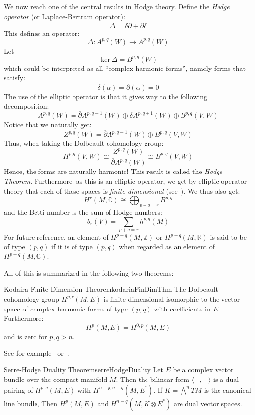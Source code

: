 \documentclass{book}
\newcommand{\C}{{\mathbb{C}}}
\newcommand{\R}{{\mathbb{R}}}
\newcommand{\Z}{{\mathbb{Z}}}
\begin{document}
We now reach one of the central results in Hodge theory. Define the \emph{Hodge operator} (or Laplace-Bertram
operator):
\[
  \Delta = \delta\overline{\partial} + \overline{\partial}\delta
\]
This defines an operator:
\[
  \Delta: A^{p,q}(W) \to A^{p,q}(W)
\]
Let
\[
  \ker\Delta = B^{p,q}(W)
\]
which could be interpreted as all ``complex harmonic forms'', namely forms that satisfy:
\[
  \delta(\alpha) = \overline{\partial}(\alpha) = 0
\]
The use of the elliptic operator is that it gives way to the following decomposition:
\[
  A^{p,q}(W) = \overline{\partial}A^{p, q-1}(W) \oplus \delta A^{p, q+1}(W) \oplus B^{p,q}(V,W)
\]
Notice that we naturally get:
\[
  Z^{p,q}(W) = \overline{\partial}A^{p, q-1}(W) \oplus B^{p,q}(V,W)
\]
Thus, when taking the Dolbeault cohomology group:
\[
  H^{p,q}(V,W) \cong \frac{Z^{p,q}(W)}{\overline{\partial}A^{p,q}(W)} \cong B^{p,q}(V,W)
\]
Hence, the forms are naturally harmonic! This result is called the \emph{Hodge Theorem}. Furthermore, as this
is an elliptic operator, we get by elliptic operator theory that each of these spaces is \emph{finite
dimensional} (see~\cite{HodgeTheory2014}). We thus also get:
\[
  H^r(M, \C) \cong \bigoplus_{p+q=r} B^{p,q}
\]
and the Betti number is the sum of Hodge numbers:
\[
  b_r(V) = \sum_{p+q=r} h^{p,q}(M)
\]
For future reference, an element of $H^{p+q}(M, \Z)$ or  $H^{p+q}(M, \R)$ is said to be of type $(p,q)$ if it
is of type $(p,q)$ when regarded as an element of $H^{p+q}(M, \C)$.

All of this is summarized in the following two theorems:

\begin{thm}{Kodaira Finite Dimension Theorem}{kodariaFinDimThm}
   The Dolbeault cohomology group $H^{p,q}(M,E)$ is finite dimensional
  isomorphic to the vector space of complex harmonic forms of type $(p,q)$ with coefficients in $E$.
  Furthermore:
  \[
    H^p(M,E) = H^{0,p}(M,E)
  \]
  and is zero for $p,q > n$.
\end{thm}

\begin{Proof}
  See for example~\cite{HodgeTheory2014} or~\cite{voisinHodgeTheoryComplex2002}.
\end{Proof}

\begin{thm}{Serre-Hodge Duality Theorem}{serreHodgeDuality}
  Let $E$ be a complex vector bundle over the compact manifold $M$. Then the bilinear form $\langle -,-
  \rangle$ is a dual pairing of $H^{p,q}(M,E)$ with $H^{n-p, n-q}(M, E^*)$. If $K = \bigwedge^n TM$ is the
  canonical line bundle, Then $H^p(M,E)$ and $H^{n-q}(M, K\otimes E^*)$ are dual vector spaces.
\end{thm}
\end{document}
